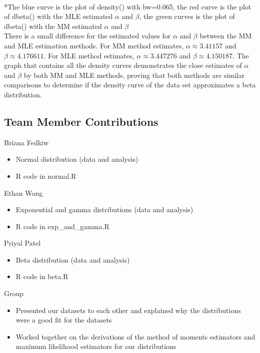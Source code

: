 \documentclass[12pt, letterpaper]{article}
\begin{document}
\footnotesize
\\ \**The blue curve is the plot of density() with bw=0.065, the red curve is the plot of dbeta() with the MLE estimated ${\alpha}$ and ${\beta}$, the green curves is the plot of dbeta() with the MM estimated ${\alpha}$ and ${\beta}$\\
\normalsize 
There is a small difference for the estimated values for ${\alpha}$ and ${\beta}$ between the MM and MLE estimation methods. For MM method estimates, $\alpha \approx 3.41157$ and $\beta \approx 4.176611$. For MLE method estimates, $\alpha \approx 3.447276$ and $\beta \approx 4.150187$. The graph that contains all the density curves demonstrates the close estimates of ${\alpha}$ and ${\beta}$ by both MM and MLE methods, proving that both methods are similar comparisons to determine if the density curve of the data set approximates a beta distribution.

\newpage
\begin{center}
    \section*{Team Member Contributions}
\end{center}

\normalsize
Briana Fedkiw
\begin{itemize}[leftmargin=50pt]
  \item Normal distribution (data and analysis)
  \item R code in normal.R
\end{itemize}

Ethan Wang
\begin{itemize}[leftmargin=50pt]
  \item Exponential and gamma distributions (data and analysis)
  \item R code in exp\_and\_gamma.R
\end{itemize}

Priyal Patel
\begin{itemize}[leftmargin=50pt]
  \item Beta distribution (data and analysis)
  \item R code in beta.R
\end{itemize}

Group
\begin{itemize}[leftmargin=50pt]
  \item Presented our datasets to each other and explained why the distributions were a good fit for the datasets
  \item Worked together on the derivations of the method of moments estimators and maximum likelihood estimators for our distributions
\end{itemize}
\end{document}
